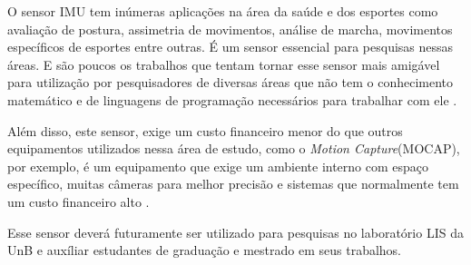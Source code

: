 O sensor IMU tem inúmeras aplicações na área da saúde e dos esportes como avaliação de postura, assimetria de movimentos, análise de marcha, movimentos específicos de esportes entre outras. É um sensor essencial para pesquisas nessas áreas. E são poucos os trabalhos que tentam tornar esse sensor mais amigável para utilização por pesquisadores de diversas áreas que não tem o conhecimento matemático e de linguagens de programação necessários para trabalhar com ele \cite{ober2015}\cite{chang2016}. 

Além disso, este sensor, exige um custo financeiro menor do que outros equipamentos utilizados nessa área de estudo, como o \textit{Motion Capture}(MOCAP), por exemplo, é um equipamento que exige um ambiente interno com espaço específico, muitas câmeras para melhor precisão e sistemas que normalmente tem um custo financeiro alto \cite{chang2016}. 

Esse sensor deverá futuramente ser utilizado para  pesquisas no laboratório LIS da UnB e auxíliar estudantes de graduação e mestrado em seus trabalhos.